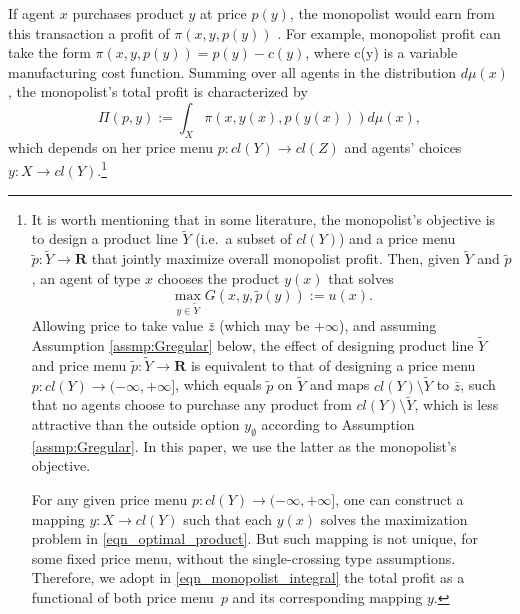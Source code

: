 \documentclass[a4paper, 11pt]{amsart}
\numberwithin{equation}{section}
\theoremstyle{plain}
\theoremstyle{definition}
\theoremstyle{remark}
\newcommand{\R}{\mathbf{R}}
\begin{document}
If agent $x$ purchases product $y$ at price $p(y)$, the monopolist would earn from this transaction a profit of $\pi(x,y,p(y))$%
.  {For example, monopolist profit can take the form $\pi(x,y,p(y)) = p(y)-c(y)$, where %
c(y) is a variable manufacturing cost function.} Summing over all agents in the distribution $d\mu(x)$, the monopolist's total profit is characterized by 
\begin{equation}\label{eqn_monopolist_integral}
	\Pi(p, y):=\int_{X} \pi(x, y(x), p(y(x))) d\mu(x),
\end{equation}
which depends on her price menu $p: cl(Y) \longrightarrow cl(Z)$ and  agents' choices $y: X \longrightarrow cl(Y)$.\footnote{It is worth mentioning that in some literature, the monopolist's objective is to design a product line $\tilde{Y}$ (i.e.~a subset of $cl(Y)$) and a price menu $\tilde{p}: \tilde{Y} \longrightarrow \R$ that jointly maximize overall monopolist profit. Then, given $\tilde{Y}$ and $\tilde{p}$, an agent of type $x$ chooses the product $y(x)$ that solves
	\begin{equation*}
		\max_{y \in \tilde{Y}} G(x,y, \tilde{p}(y)):= u(x).
	\end{equation*}
Allowing price to take value $\bar{z}$ (which may be $+\infty$), and assuming Assumption \ref{assmp:Gregular} below, the effect of designing product line $\tilde{Y}$ and price menu $\tilde{p}: \tilde{Y}\longrightarrow \R$ is equivalent to that of designing a price menu $p : cl(Y)\longrightarrow (-\infty, +\infty]$, which equals $\tilde{p}$ on $\tilde{Y}$ and maps $cl(Y) \setminus \tilde{Y}$ to $\bar{z}$, such that no agents choose to purchase any product from $cl(Y) \setminus \tilde{Y}$, which is less attractive than the outside option $y_{\emptyset}$ according to Assumption \ref{assmp:Gregular}. In this paper, we use the latter as the monopolist's objective.
 \vspace{0.1cm}
 
For any given price menu $p: cl(Y)\longrightarrow (-\infty, +\infty]$, one can construct a mapping $y: X \longrightarrow cl(Y)$ such that each $y(x)$ solves the maximization problem in \eqref{eqn_optimal_product}. But such mapping is not unique, for some fixed price menu, without the single-crossing type assumptions. %
Therefore, we adopt in \eqref{eqn_monopolist_integral} the total profit as a functional of both price menu~$p$ and its corresponding mapping $y$.}\medskip
\end{document}
